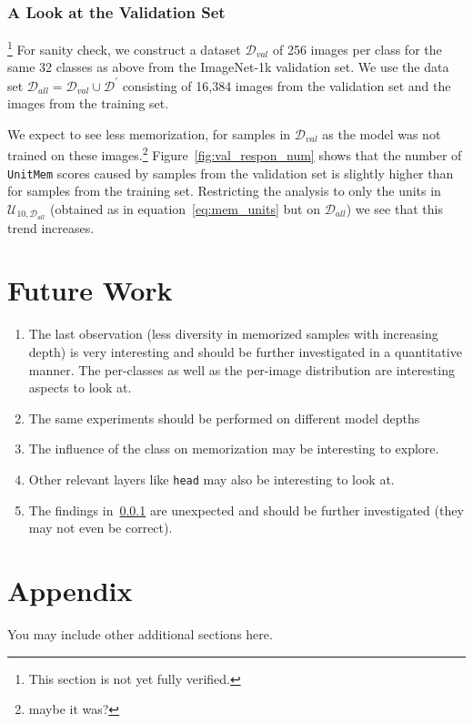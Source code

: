 \documentclass{article} %
\begin{document}
\subsubsection{A Look at the Validation Set}\label{look_at_val}\footnote{This section is not yet fully verified.}
For sanity check, we construct a dataset $\mathcal{D}_{val}$ of 256 images per class for the same 32 classes as above from the ImageNet-1k validation set.
We use the data set $\mathcal{D}_{all} = \mathcal{D}_{val} \cup \mathcal{D}^\prime$ consisting of 16,384 images from the validation set and the images from the training set.

We expect to see less memorization, for samples in $\mathcal{D}_{val}$ as the model was not trained on these images.\footnote{maybe it was?}
Figure~\ref{fig:val_respon_num} shows that the number of \texttt{UnitMem} scores caused by samples from the validation set is slightly higher than for samples from the training set.
Restricting the analysis to only the units in $\mathcal{U}_{10,\mathcal{D}_{all}}$ (obtained as in equation~\ref{eq:mem_units} but on $\mathcal{D}_{all}$) we see that this trend increases.

\section{Future Work}
\begin{enumerate}
   \item The last observation (less diversity in memorized samples with increasing depth) is very interesting and should be further investigated in a quantitative manner.
   The per-classes as well as the per-image distribution are interesting aspects to look at.
   \item The same experiments should be performed on different model depths
   \item The influence of the class on memorization may be interesting to explore.
   \item Other relevant layers like \texttt{head} may also be interesting to look at.
   \item The findings in~\ref{look_at_val} are unexpected and should be further investigated (they may not even be correct).
\end{enumerate}






\appendix
\section{Appendix}
You may include other additional sections here.
\end{document}

